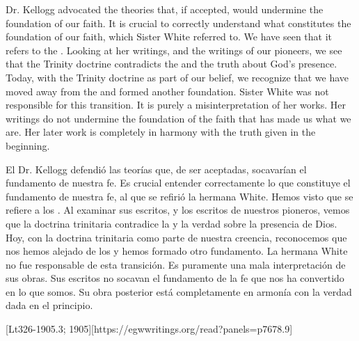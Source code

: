 Dr. Kellogg advocated the theories that, if accepted, would undermine the foundation of our faith. It is crucial to correctly understand what constitutes the foundation of our faith, which Sister White referred to. We have seen that it refers to the . Looking at her writings, and the writings of our pioneers, we see that the Trinity doctrine contradicts the  and the truth about God’s presence. Today, with the Trinity doctrine as part of our belief, we recognize that we have moved away from the  and formed another foundation. Sister White was not responsible for this transition. It is purely a misinterpretation of her works. Her writings do not undermine the foundation of the faith that has made us what we are. Her later work is completely in harmony with the truth given in the beginning.


El Dr. Kellogg defendió las teorías que, de ser aceptadas, socavarían el fundamento de nuestra fe. Es crucial entender correctamente lo que constituye el fundamento de nuestra fe, al que se refirió la hermana White. Hemos visto que se refiere a los . Al examinar sus escritos, y los escritos de nuestros pioneros, vemos que la doctrina trinitaria contradice la  y la verdad sobre la presencia de Dios. Hoy, con la doctrina trinitaria como parte de nuestra creencia, reconocemos que nos hemos alejado de los  y hemos formado otro fundamento. La hermana White no fue responsable de esta transición. Es puramente una mala interpretación de sus obras. Sus escritos no socavan el fundamento de la fe que nos ha convertido en lo que somos. Su obra posterior está completamente en armonía con la verdad dada en el principio.


[Lt326-1905.3; 1905][https://egwwritings.org/read?panels=p7678.9]


